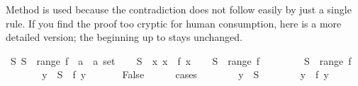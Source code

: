 \begin{isabellebody}
\begin{isamarkuptext}
Method  is used because the contradiction does not follow easily
by just a single rule. If you find the proof too cryptic for human
consumption, here is a more detailed version; the beginning up to
 stays unchanged.%
\end{isamarkuptext}%
\isamarkuptrue%
\isamarkupfalse%
\ {}{}S{}\ S\ {}\ range\ {}f\ {}{}\ {}a\ {}\ {}a\ set{}{}\isanewline
%
\isadelimproof
%
\endisadelimproof
%
\isatagproof
{}\isamarkupfalse%
\isanewline
\ \ \isamarkupfalse%
\ {}S\ {}\ {}{}x{}\ x\ {}\ f\ x{}{}\isanewline
\ \ \isamarkupfalse%
\ {}{}S\ {}\ range\ f{}\isanewline
\ \ \isamarkupfalse%
\isanewline
\ \ \ \ \isamarkupfalse%
\ {}{}S\ {}\ range\ f{}\isanewline
\ \ \ \ \isamarkupfalse%
\ \isamarkupfalse%
\ y\ \ {}{}S\ {}\ f\ y{}\ \isamarkupfalse%
\isanewline
\ \ \ \ \isamarkupfalse%
\ False\isanewline
\ \ \ \ \isamarkupfalse%
\ cases\isanewline
\ \ \ \ \ \ \isamarkupfalse%
\ {}y\ {}\ {}S{}\isanewline
\ \ \ \ \ \ \isamarkupfalse%
\ {}y\ {}\ f\ y{}\ \ \ \isamarkupfalse%

\end{isabellebody}
